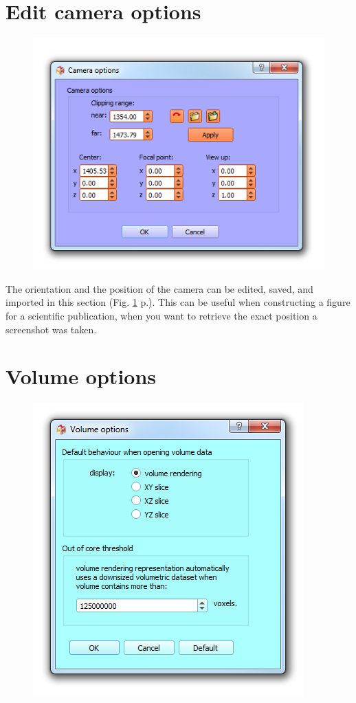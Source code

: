 \section{Edit camera options}
\begin{figure}
  \centering  
 \includegraphics[scale=0.5]{images/08/camera_options.png}
\label{camera_options}
\end{figure}

The orientation and the position of the camera can be edited, saved, and imported in this section (Fig. \ref{camera_options} p.\pageref{camera_options}).
This can be useful when constructing a figure for a scientific publication, when you want to retrieve the exact position a screenshot was taken.

\section{Volume options}
\begin{figure}
  \centering  
 \includegraphics[scale=0.5]{images/08/volume_options.png}
\label{volume_options}
\end{figure}

